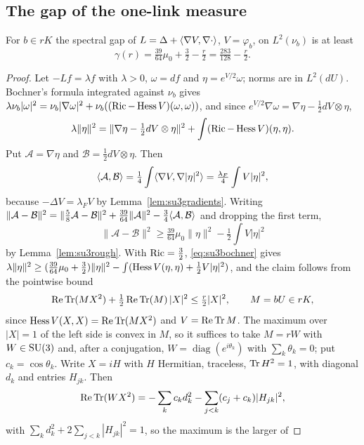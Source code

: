 \subsection{The gap of the one-link measure}

\begin{lemma}\label{lem:su3gap}
For $b\in rK$ the spectral gap of $L=\Delta+\langle \nabla V,\nabla\cdot\rangle$,
$V=\varphi_b$, on $L^2(\nu_b)$ is at least
\[
\gamma(r)=\tfrac{39}{64}\mu_0+\tfrac32-\tfrac r2=\tfrac{283}{128}-\tfrac r2 .
\]
\end{lemma}

\begin{proof}
Let $-Lf=\lambda f$ with $\lambda>0$, $\omega=df$ and $\eta=e^{V/2}\omega$;
norms are in $L^2(dU)$. Bochner's formula integrated against $\nu_b$ gives
$\lambda\nu_b|\omega|^2=\nu_b|\nabla\omega|^2+\nu_b((\operatorname{Ric}-\operatorname{Hess} V)(\omega,
\omega))$, and since $e^{V/2}\nabla\omega=\nabla\eta-\frac12dV\otimes\eta$,
\begin{equation}\label{eq:su3bochner}
\lambda\|\eta\|^2=\|\nabla\eta-\tfrac12dV\otimes\eta\|^2+\int(\operatorname{Ric}-\operatorname{Hess} V)
(\eta,\eta).
\end{equation}
Put $\mathcal A=\nabla\eta$ and $\mathcal B=\frac12dV\otimes\eta$. Then
\[
\langle \mathcal A,\mathcal B\rangle=\tfrac14\int\langle \nabla V,\nabla|\eta|^2\rangle
=\tfrac{\lambda_F}4\int V|\eta|^2 ,
\]
because $-\Delta V=\lambda_FV$ by Lemma~\ref{lem:su3gradients}. Writing
$\|\mathcal A-\mathcal B\|^2=\|\frac58\mathcal A-\mathcal B\|^2+\frac{39}{64}
\|\mathcal A\|^2-\frac34\langle \mathcal A,\mathcal B\rangle$ and dropping the first
term,
\[
\|\mathcal A-\mathcal B\|^2\ge\tfrac{39}{64}\mu_0\|\eta\|^2-\tfrac12\int
V|\eta|^2
\]
by Lemma~\ref{lem:su3rough}. With $\operatorname{Ric}=\frac32$, \eqref{eq:su3bochner} gives
$\lambda\|\eta\|^2\ge(\frac{39}{64}\mu_0+\frac32)\|\eta\|^2-\int(\operatorname{Hess} V(\eta,
\eta)+\frac12V|\eta|^2)$, and the claim follows from the pointwise bound
\begin{equation}\label{eq:su3pointwise}
\operatorname{Re}\operatorname{Tr}(MX^2)+\tfrac12\operatorname{Re}\operatorname{Tr}(M)\,|X|^2\le\tfrac r2|X|^2,\qquad M=bU\in rK ,
\end{equation}
since $\operatorname{Hess} V(X,X)=\operatorname{Re}\operatorname{Tr}(MX^2)$ and $V=\operatorname{Re}\operatorname{Tr} M$. The maximum over $|X|=1$ of
the left side is convex in $M$, so it suffices to take $M=rW$ with $W\in
\mathrm{SU}(3)$ and, after a conjugation, $W=\operatorname{diag}(e^{i\theta_k})$ with
$\sum_k\theta_k=0$; put $c_k=\cos\theta_k$. Write $X=iH$ with $H$ Hermitian,
traceless, $\operatorname{Tr} H^2=1$, with diagonal $d_k$ and entries $H_{jk}$. Then
\[
\operatorname{Re}\operatorname{Tr}(WX^2)=-\sum_kc_kd_k^2-\sum_{j<k}(c_j+c_k)|H_{jk}|^2 ,
\]
with $\sum_kd_k^2+2\sum_{j<k}|H_{jk}|^2=1$, so the maximum is the larger of

\end{proof}
